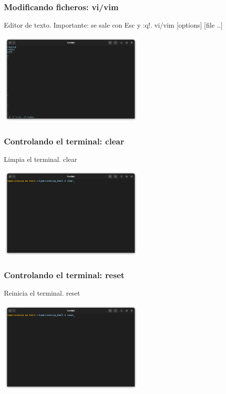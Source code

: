 \documentclass[10pt]{beamer}
\begin{document}
	\begin{frame}
		\frametitle{Modificando ficheros: vi/vim}
		\begin{alertblock}{Editor de texto. Importante: se sale con Esc y :q!.}
			vi/vim [options] [file ..]
		\end{alertblock}
		\begin{center}
			\includegraphics[width=0.55\textwidth]{vim}
		\end{center}
	\end{frame}
	
	\begin{frame}
		\frametitle{Controlando el terminal: clear}
		\begin{alertblock}{Limpia el terminal.}
			clear
		\end{alertblock}
		\begin{center}
			\includegraphics[width=0.55\textwidth]{clear}
		\end{center}

	\end{frame}	
	
	\begin{frame}
		\frametitle{Controlando el terminal: reset}
		\begin{alertblock}{Reinicia el terminal.}
			reset
		\end{alertblock}
		\begin{center}
			\includegraphics[width=0.55\textwidth]{reset}
		\end{center}
	\end{frame}	
	
\end{document}
